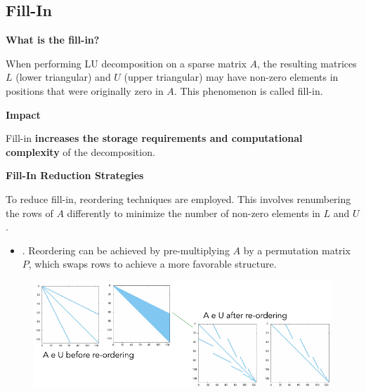 \subsection{Fill-In}

\begin{flushleft}
    \textcolor{Green3}{ \textbf{What is the fill-in?}}
\end{flushleft}
When performing LU decomposition on a sparse matrix $A$, the resulting matrices $L$ (lower triangular) and $U$ (upper triangular) may have non-zero elements in positions that were originally zero in $A$. This phenomenon is called fill-in.

\highspace
\begin{flushleft}
    \textcolor{Red2}{ \textbf{Impact}}
\end{flushleft}
Fill-in \textbf{increases the storage requirements and computational complexity} of the decomposition. 

\highspace
\begin{flushleft}
    \textcolor{Green3}{ \textbf{Fill-In Reduction Strategies}}
\end{flushleft}
To reduce fill-in, reordering techniques are employed. This involves renumbering the rows of $A$ differently to minimize the number of non-zero elements in $L$ and $U$.
\begin{itemize}
    \item {}. Reordering can be achieved by pre-multiplying $A$ by a permutation matrix $P$, which swaps rows to achieve a more favorable structure.
\end{itemize}
\begin{figure}[!htp]
    \centering
    \includegraphics[width=\textwidth]{img/fill-in-1.pdf}
\end{figure}